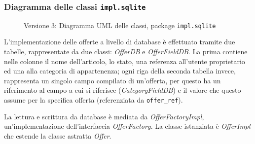 \subsubsection{Diagramma delle classi \texttt{impl.sqlite}}
\vspace{0.5cm}
\begin{figure}[H]
    \centering
    \caption{Versione 3: Diagramma UML delle classi, package \texttt{impl.sqlite}}
    \label{fig:class_db_v_3}
\end{figure}

L'implementazione delle offerte a livello di database è effettuato tramite due tabelle, rappresentate da due classi: \textit{OfferDB} e \textit{OfferFieldDB}.
La prima contiene nelle colonne il nome dell'articolo, lo stato, una referenza all'utente proprietario ed una alla categoria di appartenenza; ogni riga della seconda tabella invece,
rappresenta un singolo campo compilato di un'offerta, per questo ha un riferimento al campo a cui si riferisce (\textit{CategoryFieldDB}) e il valore che questo assume per la specifica offerta
(referenziata da \texttt{offer\_ref}).

La lettura e scrittura da database è mediata da \textit{OfferFactoryImpl}, un'implementazione dell'interfaccia
\textit{OfferFactory}. La classe istanziata è \textit{OfferImpl} che estende la classe astratta \textit{Offer}.